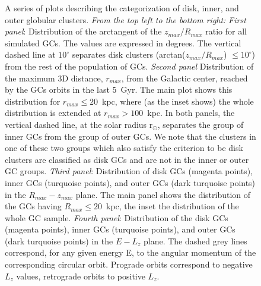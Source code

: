 \begin{figure}
\begin{center}
                \caption[A series of plots describing the categorization of disk, inner, and outer globular clusters]{ A series of plots describing the categorization of disk, inner, and outer globular clusters. \emph{From the top left to the bottom right:} \emph{First panel}: Distribution of the arctangent of the $z_{max}/R_{max}$ ratio for all simulated GCs. The values are expressed in degrees. The vertical dashed line at $10^\circ$ separates disk clusters (arctan($z_{max}/R_{max}$) $\le 10^\circ$) from the rest of the population of GCs. \emph{Second panel} Distribution of the maximum 3D distance, $r_{max}$, from the Galactic center, reached by the GCs orbits in the last 5~Gyr. The main plot shows this distribution for $r_{max} \le 20$~kpc, where (as the inset shows) the whole distribution is extended at $r_{max} > 100$~kpc.  In both panels, the vertical dashed line, at the solar radius r$_{\odot}$, separates the group of inner GCs from the group of outer GCs. We note that the clusters in one of these two groups which also satisfy the criterion to be disk clusters are classified as disk GCs and are not in the inner or outer GC groups. \emph{Third panel}: Distribution of disk GCs (magenta points), inner GCs (turquoise points), and outer GCs (dark turquoise points) in the $R_{max}-z_{max}$  plane. The main panel shows the distribution of the GCs having $R_{max} \le 20$~kpc, the inset  the distribution of the whole GC sample. \emph{Fourth panel}: Distribution of the disk GCs (magenta points), inner GCs (turquoise points), and outer GCs (dark turquoise points) in the $E-L_z$ plane. The dashed grey lines correspond, for any given energy E, to the angular momentum of the corresponding circular orbit. Prograde orbits correspond to negative $L_z$ values, retrograde orbits to positive $L_z$.
                }\label{orbparam}
            \end{center}
        \end{figure}


